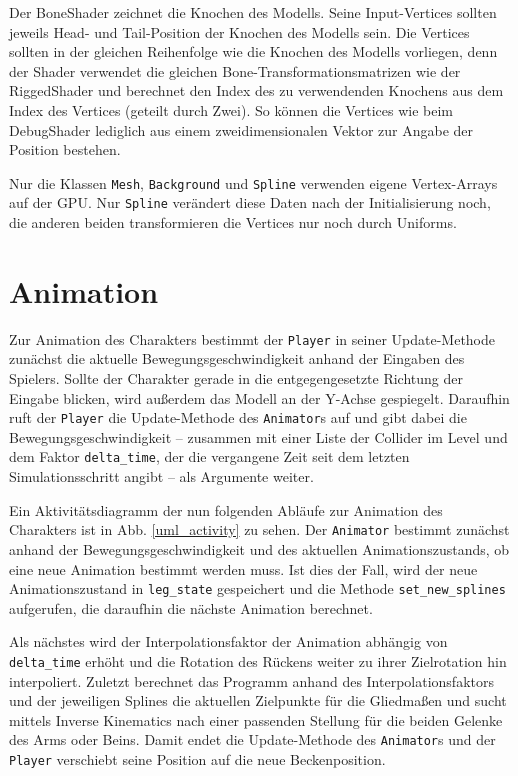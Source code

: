 Der BoneShader zeichnet die Knochen des Modells. Seine Input-Vertices sollten jeweils Head- und Tail-Position der Knochen des Modells sein. Die Vertices sollten in der gleichen Reihenfolge wie die Knochen des Modells vorliegen, denn der Shader verwendet die gleichen Bone-Transformationsmatrizen wie der RiggedShader und berechnet den Index des zu verwendenden Knochens aus dem Index des Vertices (geteilt durch Zwei). So können die Vertices wie beim DebugShader lediglich aus einem zweidimensionalen Vektor zur Angabe der Position bestehen.

Nur die Klassen \lstinline{Mesh}, \lstinline{Background} und \lstinline{Spline} verwenden eigene Vertex-Arrays auf der GPU. Nur \lstinline{Spline} verändert diese Daten nach der Initialisierung noch, die anderen beiden transformieren die Vertices nur noch durch Uniforms.

\section{Animation} \label{animator_section}
Zur Animation des Charakters bestimmt der \lstinline{Player} in seiner Update-Methode zunächst die aktuelle Bewegungsgeschwindigkeit anhand der Eingaben des Spielers. Sollte der Charakter gerade in die entgegengesetzte Richtung der Eingabe blicken, wird außerdem das Modell an der Y-Achse gespiegelt. Daraufhin ruft der \lstinline{Player} die Update-Methode des \lstinline{Animator}s auf und gibt dabei die Bewegungsgeschwindigkeit -- zusammen mit einer Liste der Collider im Level und dem Faktor \lstinline{delta_time}, der die vergangene Zeit seit dem letzten Simulationsschritt angibt -- als Argumente weiter.

Ein Aktivitätsdiagramm der nun folgenden Abläufe zur Animation des Charakters ist in Abb. \ref{uml_activity} zu sehen. Der \lstinline{Animator} bestimmt zunächst anhand der Bewegungsgeschwindigkeit und des aktuellen Animationszustands, ob eine neue Animation bestimmt werden muss. Ist dies der Fall, wird der neue Animationszustand in \lstinline{leg_state} gespeichert und die Methode \lstinline{set_new_splines} aufgerufen, die daraufhin die nächste Animation berechnet.

Als nächstes wird der Interpolationsfaktor der Animation abhängig von \lstinline{delta_time} erhöht und die Rotation des Rückens weiter zu ihrer Zielrotation hin interpoliert. Zuletzt berechnet das Programm anhand des Interpolationsfaktors und der jeweiligen Splines die aktuellen Zielpunkte für die Gliedmaßen und sucht mittels Inverse Kinematics nach einer passenden Stellung für die beiden Gelenke des Arms oder Beins. Damit endet die Update-Methode des \lstinline{Animator}s und der \lstinline{Player} verschiebt seine Position auf die neue Beckenposition.

